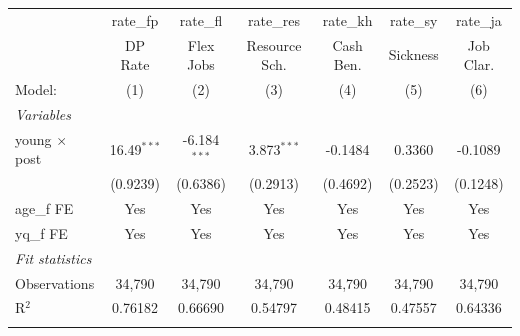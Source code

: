 
\begingroup
\centering
\begin{tabular}{lcccccc}
   \tabularnewline \midrule \midrule
                        & rate\_fp      & rate\_fl       & rate\_res     & rate\_kh  & rate\_sy  & rate\_ja\\   
                        & DP Rate       & Flex Jobs      & Resource Sch. & Cash Ben. & Sickness  & Job Clar. \\   
   Model:               & (1)           & (2)            & (3)           & (4)       & (5)       & (6)\\  
   \midrule
   \emph{Variables}\\
   young $\times$ post  & 16.49$^{***}$ & -6.184$^{***}$ & 3.873$^{***}$ & -0.1484   & 0.3360    & -0.1089\\   
                        & (0.9239)      & (0.6386)       & (0.2913)      & (0.4692)  & (0.2523)  & (0.1248)\\   
   \midrule 
   age\_f FE            & Yes           & Yes            & Yes           & Yes       & Yes       & Yes\\  
   yq\_f FE             & Yes           & Yes            & Yes           & Yes       & Yes       & Yes\\  
   \midrule
   \emph{Fit statistics}\\
   Observations         & 34,790        & 34,790         & 34,790        & 34,790    & 34,790    & 34,790\\  
   R$^2$                & 0.76182       & 0.66690        & 0.54797       & 0.48415   & 0.47557   & 0.64336\\  
   \midrule \midrule & \tabularnewline
\end{tabular}
\par\endgroup


